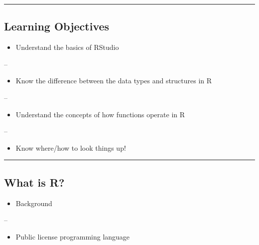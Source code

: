 \documentclass[]{article}
\providecommand{\tightlist}{%
  \setlength{\itemsep}{0pt}\setlength{\parskip}{0pt}}
\begin{document}
\begin{center}\rule{0.5\linewidth}{\linethickness}\end{center}

\hypertarget{learning-objectives}{%
\subsection{Learning Objectives}\label{learning-objectives}}

\begin{itemize}
\tightlist
\item
  Understand the basics of RStudio
\end{itemize}

--

\begin{itemize}
\tightlist
\item
  Know the difference between the data types and structures in R
\end{itemize}

--

\begin{itemize}
\tightlist
\item
  Understand the concepts of how functions operate in R
\end{itemize}

--

\begin{itemize}
\tightlist
\item
  Know where/how to look things up!
\end{itemize}

\begin{center}\rule{0.5\linewidth}{\linethickness}\end{center}

\hypertarget{what-is-r}{%
\subsection{What is R?}\label{what-is-r}}

\begin{itemize}
\tightlist
\item
  Background
\end{itemize}

--

\begin{itemize}
\tightlist
\item
  Public license programming language
\end{itemize}
\end{document}
